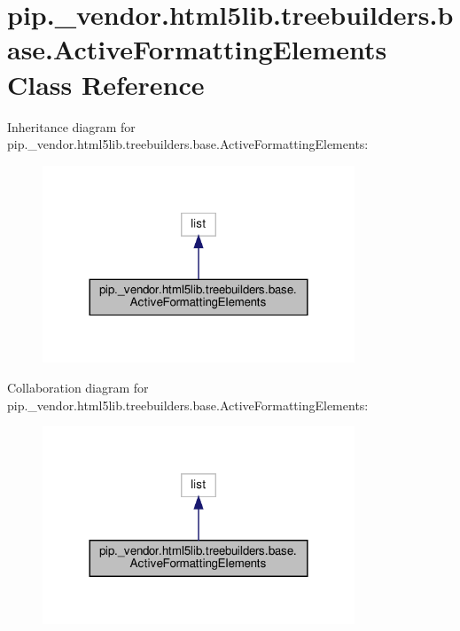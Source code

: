 \hypertarget{classpip_1_1__vendor_1_1html5lib_1_1treebuilders_1_1base_1_1ActiveFormattingElements}{}\section{pip.\+\_\+vendor.\+html5lib.\+treebuilders.\+base.\+Active\+Formatting\+Elements Class Reference}
\label{classpip_1_1__vendor_1_1html5lib_1_1treebuilders_1_1base_1_1ActiveFormattingElements}


Inheritance diagram for pip.\+\_\+vendor.\+html5lib.\+treebuilders.\+base.\+Active\+Formatting\+Elements\+:
\nopagebreak
\begin{figure}[H]
\begin{center}
\leavevmode
\includegraphics[width=264pt]{classpip_1_1__vendor_1_1html5lib_1_1treebuilders_1_1base_1_1ActiveFormattingElements__inherit__graph}
\end{center}
\end{figure}


Collaboration diagram for pip.\+\_\+vendor.\+html5lib.\+treebuilders.\+base.\+Active\+Formatting\+Elements\+:
\nopagebreak
\begin{figure}[H]
\begin{center}
\leavevmode
\includegraphics[width=264pt]{classpip_1_1__vendor_1_1html5lib_1_1treebuilders_1_1base_1_1ActiveFormattingElements__coll__graph}
\end{center}
\end{figure}
